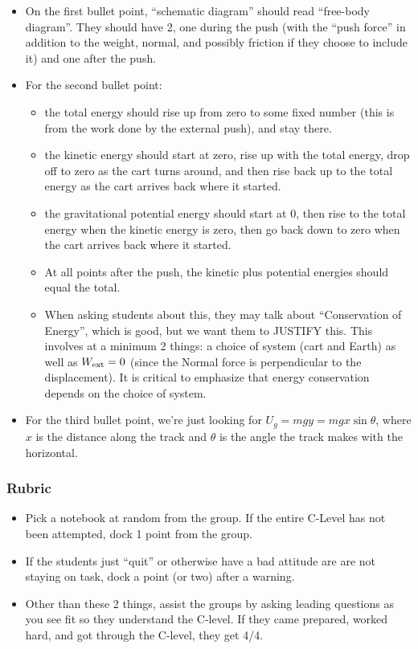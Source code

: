 \documentclass[fleqn,letterpaper]{article}
\begin{document}
\begin{itemize}
 \item{On the first bullet point, ``schematic diagram'' should read ``free-body diagram''.  They should have 2, one during the push (with the ``push force'' in addition to the weight, normal, and possibly friction if they choose to include it) and one after the push.}
 \item{For the second bullet point:
 \begin{itemize}
 \item{the total energy should rise up from zero to some fixed number (this is from the work done by the external push), and stay there.}
 \item{the kinetic energy should start at zero, rise up with the total energy, drop off to zero as the cart turns around, and then rise back up to the total energy as the cart arrives back where it started.}
 \item{the gravitational potential energy should start at 0, then rise to the total energy when the kinetic energy is zero, then go back down to zero when the cart arrives back where it started.}
 \item{At all points after the push, the kinetic plus potential energies should equal the total.}
 \item{When asking students about this, they may talk about ``Conservation of Energy'', which is good, but we want them to JUSTIFY this.  This involves at a minimum 2 things: a choice of system (cart and Earth) as well as $W_{\rm ext} = 0$ (since the Normal force is perpendicular to the displacement).  It is critical to emphasize that energy conservation depends on the choice of system.}
 \end{itemize}}
 \item{For the third bullet point, we're just looking for $U_g = mgy = mgx\sin \theta$, where $x$ is the distance along the track and $\theta$ is the angle the track makes with the horizontal.}
 \end{itemize}

\subsubsection*{Rubric}

\begin{itemize}
 \item{Pick a notebook at random from the group.  If the entire C-Level has not been attempted, dock 1 point from the group.}
 \item{If the students just ``quit'' or otherwise have a bad attitude are are not staying on task, dock a point (or two) after a warning.}
 \item{Other than these 2 things, assist the groups by asking leading questions as you see fit so they understand the C-level.  If they came prepared, worked hard, and got through the C-level, they get 4/4.}
\end{itemize}
\end{document}
